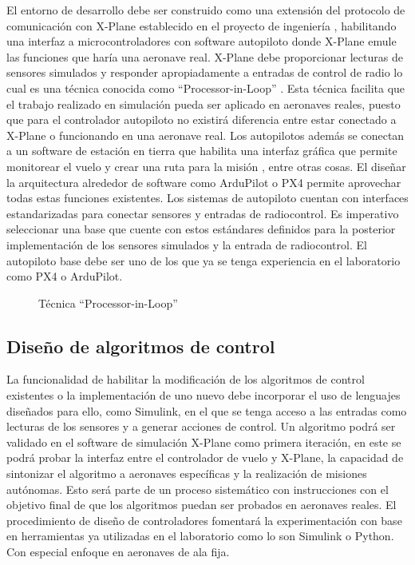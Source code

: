 El entorno de desarrollo debe ser construido como una extensión del protocolo de comunicación con X-Plane establecido en el proyecto de ingeniería \cite{pia}, habilitando una interfaz a microcontroladores con software autopiloto donde X-Plane emule las funciones que haría una aeronave real. X-Plane debe proporcionar lecturas de sensores simulados y responder apropiadamente a entradas de control de radio lo cual es una técnica conocida como ``Processor-in-Loop'' \cite{pil}. Esta técnica facilita que el trabajo realizado en simulación pueda ser aplicado en aeronaves reales, puesto que para el controlador autopiloto no existirá diferencia entre estar conectado a X-Plane o funcionando en una aeronave real. Los autopilotos además se conectan a un software de estación en tierra que habilita una interfaz gráfica que permite monitorear el vuelo y crear una ruta para la misión \cite{ardupilot-gs}, entre otras cosas. El diseñar la arquitectura alrededor de software como ArduPilot o PX4 permite aprovechar todas estas funciones existentes. Los sistemas de autopiloto cuentan con interfaces estandarizadas para conectar sensores y entradas de radiocontrol. Es imperativo seleccionar una base que cuente con estos estándares definidos para la posterior implementación de los sensores simulados y la entrada de radiocontrol. El autopiloto base debe ser uno de los que ya se tenga experiencia en el laboratorio como PX4 o ArduPilot.

\begin{figure}[h]
    \centering
    
    \caption{Técnica ``Processor-in-Loop''}
    \label{fig:pil}
\end{figure}

\subsection{Diseño de algoritmos de control}

La funcionalidad de habilitar la modificación de los algoritmos de control existentes o la implementación de uno nuevo debe incorporar el uso de lenguajes diseñados para ello, como Simulink, en el que se tenga acceso a las entradas como lecturas de los sensores y a generar acciones de control. Un algoritmo podrá ser validado en el software de simulación X-Plane como primera iteración, en este se podrá probar la interfaz entre el controlador de vuelo y X-Plane, la capacidad de sintonizar el algoritmo a aeronaves específicas y la realización de misiones autónomas. Esto será parte de un proceso sistemático con instrucciones con el objetivo final de que los algoritmos puedan ser probados en aeronaves reales. El procedimiento de diseño de controladores fomentará la experimentación con base en herramientas ya utilizadas en el laboratorio como lo son Simulink o Python. Con especial enfoque en aeronaves de ala fija.

